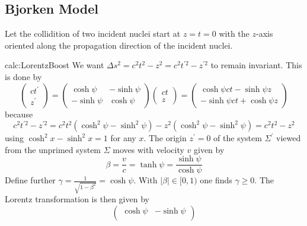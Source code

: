 \subsection{Bjorken Model \cite{Ollitrault_2008}}

Let the collidition of two incident nuclei start at $z=t=0$ with the $z$-axis oriented along the propagation direction of the incident nuclei.

\begin{calc}{calc:LorentzBoost}
    We want $\Delta s^2=c^2t^2-z^2=c^2t^{\prime 2}-z^{\prime 2}$ to remain invariant. This is done by
    \begin{equation}
        \begin{pmatrix}
            ct^\prime \\z^\prime
        \end{pmatrix}
        =
        \begin{pmatrix}
            \cosh\psi  & -\sinh\psi \\
            -\sinh\psi & \cosh\psi
        \end{pmatrix}
        \begin{pmatrix}
            ct \\z
        \end{pmatrix}
        =
        \begin{pmatrix}
            \cosh\psi ct-\sinh\psi z \\
            -\sinh\psi ct+\cosh\psi z
        \end{pmatrix}
    \end{equation}
    because
    \begin{equation*}
        c^2t^{\prime 2}-z^{\prime 2}=c^2t^2(\cosh^2\psi-\sinh^2\psi)-z^2(\cosh^2\psi-\sinh^2\psi)=c^2t^2-z^2
    \end{equation*}
    using $\cosh^2x-\sinh^2x=1$ for any $x$. The origin $z^\prime=0$ of the system $\Sigma^\prime$ viewed from the unprimed system $\Sigma$ moves with velocity $v$ given by
    \begin{equation}
        \beta=\frac{v}{c}=\tanh\psi=\frac{\sinh\psi}{\cosh\psi}
    \end{equation}
    Define further $\gamma=\frac{1}{\sqrt{1-\beta^2}}=\cosh\psi$. With $\vert\beta\vert\in [0,1)$ one finds $\gamma\geq 0$. The Lorentz transformation is then given by
    \begin{equation}
        \begin{pmatrix}
            \cosh\psi  & -\sinh\psi \\

\end{pmatrix}
\end{equation}
\end{calc}

